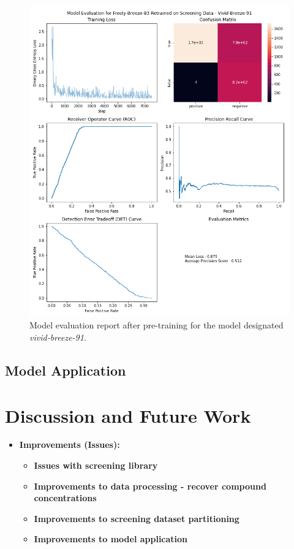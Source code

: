 \documentclass{article}
\begin{document}
\begin{figure}
	\caption{\label{vividbreeze} Model evaluation report after pre-training for the model designated \textit{vivid-breeze-91}.}
	\includegraphics[width = \textwidth]{img/frosty-breeze-83-vivid-breeze-91-eval.png}
\end{figure}
\subsection{Model Application}
\section{Discussion and Future Work}

\begin{itemize}
	\item \textbf{Improvements (Issues):}
	\begin{itemize}
		\item \textbf{Issues with screening library}
		\item \textbf{Improvements to data processing - recover compound concentrations}
		\item \textbf{Improvements to screening dataset partitioning}
		\item \textbf{Improvements to model application}
	\end{itemize}
\end{itemize}

\printbibliography
\end{document}

